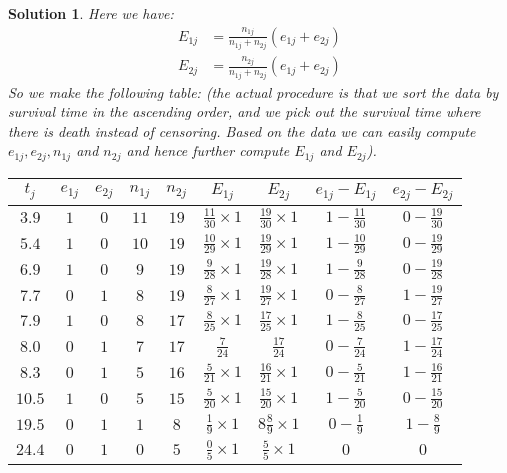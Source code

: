 \documentclass[11pt]{article}
\newtheorem{sol}{Solution}
\begin{document}
\begin{sol}
	Here we have:
	\begin{align*}
		E_{1j} &= \frac{n_{1j}}{n_{1j} + n_{2j}}(e_{1j} + e_{2j})\\
		E_{2j} &= \frac{n_{2j}}{n_{1j} + n_{2j}}(e_{1j} + e_{2j})
	\end{align*}
	So we make the following table:\vskip 2mm
	(the actual procedure is that we sort the data by survival time in the ascending order, and we pick out the survival time where there is death instead of censoring. Based on the data we can easily compute $e_{1j}, e_{2j}, n_{1j}$ and $n_{2j}$ and hence further compute $E_{1j}$ and $E_{2j}$).
	\vskip 2mm
	\begin{tabular}{|c|c|c|c|c|c|c|c|c|}
		\hline
		$t_j$ & $e_{1j}$ & $e_{2j}$ & $n_{1j}$ & $n_{2j}$ & $E_{1j}$ & $E_{2j}$ & $e_{1j} - E_{1j}$ & $e_{2j} - E_{2j}$ \\
		\hline
		 $3.9$ & $1$ & $0$ & $11$ & $19$ & $\frac{11}{30} \times 1$ & $\frac{19}{30} \times 1$ & $1 - \frac{11}{30}$ & $0 - \frac{19}{30}$\\
		 \hline
		 $5.4$ & $1$ & $0$ & $10$ & $19$ & $\frac{10}{29}\times 1$ & $\frac{19}{29} \times 1$ & $1 - \frac{10}{29}$ & $0 - \frac{19}{29}$\\
		 \hline
		 $6.9$ & $1$ & $0$ & $9$ & $19$ & $\frac{9}{28}\times 1$ & $\frac{19}{28} \times 1$ & $1 - \frac{9}{28}$ & $0 - \frac{19}{28}$ \\
		 \hline
		 $7.7$ & $0$ & $1$ & $8$ & $19$ & $\frac{8}{27} \times 1$ & $\frac{19}{27}\times 1$ & $0 - \frac{8}{27}$ & $1 - \frac{19}{27}$\\
		 \hline
		 $7.9$ & $1$ & $0$ & $8$ & $17$ & $\frac{8}{25} \times 1$ & $\frac{17}{25} \times 1$ & $1 - \frac{8}{25}$& $0 - \frac{17}{25}$\\
		 \hline
		 $8.0$ & $0$ & $1$ & $7$ & $17$ & $\frac{7}{24}$ & $\frac{17}{24}$ & $0 - \frac{7}{24}$ &$1 - \frac{17}{24}$\\
		 \hline
		 $8.3$ & $0$ & $1$ & $5$ & $16$ & $\frac{5}{21} \times 1$ & $\frac{16}{21} \times 1$ & $0 - \frac{5}{21}$ & $1 - \frac{16}{21}$\\
		 \hline
		 $10.5$ & $1$ & $0$ & $5$ & $15$ & $\frac{5}{20}\times 1$  & $\frac{15}{20} \times 1$ & $1 - \frac{5}{20}$ & $0 - \frac{15}{20}$\\
		 \hline
		 $19.5$ & $0$ & $1$ & $1$ & $8$ & $\frac{1}{9} \times 1$& $8 \frac{8}{9} \times 1$ & $0 - \frac{1}{9}$ & $1 - \frac{8}{9}$\\
		 \hline
		 $24.4$ & $0$ & $1$ & $0$ & $5$ & $\frac{0}{5} \times 1$ & $\frac{5}{5}\times 1$ & $0$ & $0$\\

\end{tabular}
\end{sol}
\end{document}
